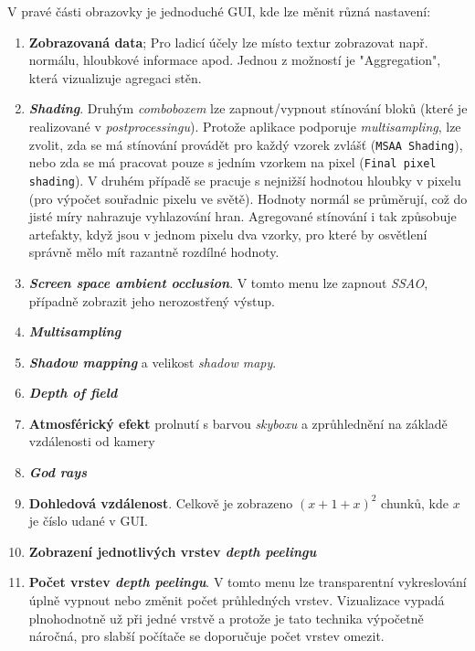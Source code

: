 \pagebreak
V pravé části obrazovky je jednoduché GUI, kde lze měnit různá nastavení:
\begin{enumerate}
	\item \textbf{Zobrazovaná data}; Pro ladicí účely lze místo textur zobrazovat např. normálu, hloubkové informace apod. Jednou z možností je "Aggregation", která vizualizuje agregaci stěn.
	
	\item \textbf{\textit{Shading}}. Druhým \textit{comboboxem} lze zapnout/vypnout stínování bloků (které je realizované v \textit{postprocessingu}). Protože aplikace podporuje \textit{multisampling}, lze zvolit, zda se má stínování provádět pro každý vzorek zvlášť (\verb|MSAA Shading|), nebo zda se má pracovat pouze s jedním vzorkem na pixel (\verb|Final pixel shading|). V druhém případě se pracuje s nejnižší hodnotou hloubky v pixelu (pro výpočet souřadnic pixelu ve světě). Hodnoty normál se průměrují, což do jisté míry nahrazuje vyhlazování hran. Agregované stínování i tak způsobuje artefakty, když jsou v jednom pixelu dva vzorky, pro které by osvětlení správně mělo mít razantně rozdílné hodnoty.
	

	\item \textbf{\textit{Screen space ambient occlusion}}. V tomto menu lze zapnout \textit{SSAO}, případně zobrazit jeho nerozostřený výstup.
	
	\item \textbf{\textit{Multisampling}}
	\item \textbf{\textit{Shadow mapping}} a velikost \textit{shadow mapy}.
	\item \textbf{\textit{Depth of field}}
	\item \textbf{Atmosférický efekt} prolnutí s barvou \textit{skyboxu} a zprůhlednění na základě vzdálenosti od kamery
	\item \textbf{\textit{God rays}}
	\item \textbf{Dohledová vzdálenost}. Celkově je zobrazeno $(x+1+x)^2$ chunků, kde $x$ je číslo udané v GUI.
	
	\item \textbf{Zobrazení jednotlivých vrstev \textit{depth peelingu}}
	
	\item \textbf{Počet vrstev \textit{depth peelingu}}. V tomto menu lze transparentní vykreslování úplně vypnout nebo změnit počet průhledných vrstev. Vizualizace vypadá plnohodnotně už při jedné vrstvě a protože je tato technika výpočetně náročná, pro slabší počítače se doporučuje počet vrstev omezit.
	

\end{enumerate}
